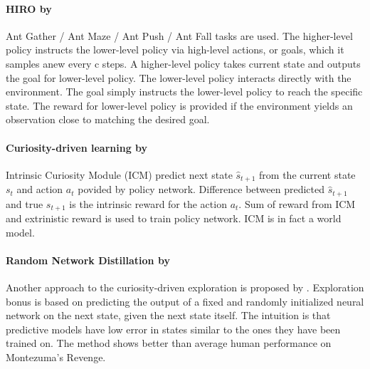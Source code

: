\documentclass{article}
\begin{document}
\paragraph{HIRO by~\citet{Nachum2018DataEfficientHR}} %
\label{par:hiro}

Ant Gather / Ant Maze / Ant Push / Ant Fall tasks are used. The higher-level policy instructs the lower-level policy via high-level actions, or goals, which it samples anew every c steps. A higher-level policy takes current state and outputs the goal for lower-level policy. The lower-level policy interacts directly with the environment. The goal simply instructs the lower-level policy to reach the specific state. The reward for lower-level policy is provided if the environment yields an observation close to matching the desired goal.


\paragraph{Curiosity-driven learning by~\citet{pathak_curiosity-driven_2017}} %
\label{par:curiosity_driven_rl}

Intrinsic Curiosity Module (ICM) predict next state $\hat{s}_{t+1}$ from the current state $s_t$ and action $a_t$ povided by policy network. Difference between predicted $\hat{s}_{t+1}$ and true $s_{t+1}$ is the intrinsic reward for the action $a_t$. Sum of reward from ICM and extrinistic reward is used to train policy network. ICM is in fact a world model.


\paragraph{Random Network Distillation by~\citet{burda_exploration_2019}} %
\label{par:random_distillation}

Another approach to the curiosity-driven exploration is proposed by \citep{burda_exploration_2019}. Exploration bonus is based on predicting the output of a fixed and randomly initialized neural network on the next state, given the next state itself. The intuition is that predictive models have low error in states similar to the ones they have been trained on. The method shows better than average human performance on Montezuma’s Revenge.

\end{document}

